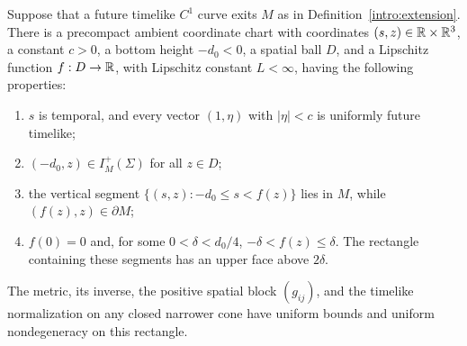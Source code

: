 \begin{lemma}
\label{ex:graph}
Suppose that a future timelike $C^1$ curve exits $M$ as in
Definition~\ref{intro:extension}.  There is a precompact ambient coordinate chart
with coordinates $(s,z)\in\mathbb R\times\mathbb R^3$, a constant $c>0$, a
bottom height $-d_0<0$, a spatial ball $D$, and a Lipschitz
function $f:D\to\mathbb R$, with Lipschitz constant $L<\infty$, having the
following properties:
\begin{enumerate}[label=(\roman*)]
\item $s$ is temporal, and every vector $(1,\eta)$ with
      $|\eta|<c$ is uniformly future timelike;
\item $(-d_0,z)\in I_M^+(\Sigma)$ for all $z\in D$;
\item the vertical segment $\{(s,z):-d_0\le s<f(z)\}$ lies in
      $M$, while $(f(z),z)\in\partial M$;
\item $f(0)=0$ and, for some $0<\delta<d_0/4$,
      $-\delta<f(z)\le\delta$.  The rectangle containing these
      segments has an upper face above $2\delta$.
\end{enumerate}
The metric, its inverse, the positive spatial block $(g_{ij})$,
and the timelike normalization on any closed narrower cone have
uniform bounds and uniform nondegeneracy on this rectangle.
\end{lemma}

